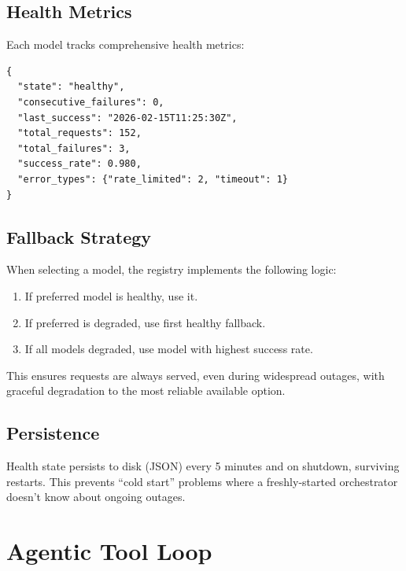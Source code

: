 \documentclass{article}
\begin{document}
\subsection{Health Metrics}

Each model tracks comprehensive health metrics:

\begin{lstlisting}[style=jsoncode]
{
  "state": "healthy",
  "consecutive_failures": 0,
  "last_success": "2026-02-15T11:25:30Z",
  "total_requests": 152,
  "total_failures": 3,
  "success_rate": 0.980,
  "error_types": {"rate_limited": 2, "timeout": 1}
}
\end{lstlisting}

\subsection{Fallback Strategy}

When selecting a model, the registry implements the following logic:

\begin{enumerate}[leftmargin=*]
    \item If preferred model is healthy, use it.
    \item If preferred is degraded, use first healthy fallback.
    \item If all models degraded, use model with highest success rate.
\end{enumerate}

This ensures requests are always served, even during widespread outages, with graceful degradation to the most reliable available option.

\subsection{Persistence}

Health state persists to disk (JSON) every 5 minutes and on shutdown, surviving restarts. This prevents ``cold start'' problems where a freshly-started orchestrator doesn't know about ongoing outages.



\section{Agentic Tool Loop}
\label{sec:toolloop}
\end{document}
